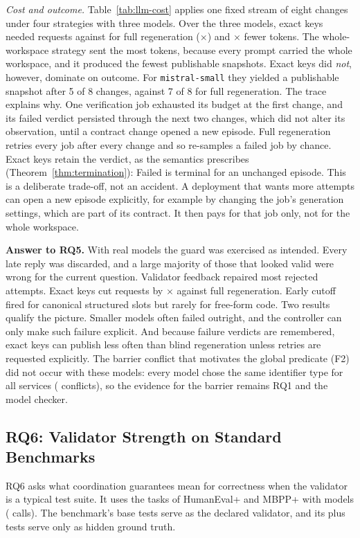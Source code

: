 \emph{Cost and outcome.} Table~\ref{tab:llm-cost} applies one fixed stream of eight changes under four strategies with three models. Over the three models, exact keys needed \LlmCostExactReq{} requests against \LlmCostFullReq{} for full regeneration (\LlmCostRatio$\times$) and \LlmCostTokenRatio$\times$ fewer tokens. The whole-workspace strategy sent the most tokens, because every prompt carried the whole workspace, and it produced the fewest publishable snapshots. Exact keys did \emph{not}, however, dominate on outcome. For \texttt{mistral-small} they yielded a publishable snapshot after 5 of 8 changes, against 7 of 8 for full regeneration. The trace explains why. One verification job exhausted its budget at the first change, and its failed verdict persisted through the next two changes, which did not alter its observation, until a contract change opened a new episode. Full regeneration retries every job after every change and so re-samples a failed job by chance. Exact keys retain the verdict, as the semantics prescribes (Theorem~\ref{thm:termination}): Failed is terminal for an unchanged episode. This is a deliberate trade-off, not an accident. A deployment that wants more attempts can open a new episode explicitly, for example by changing the job's generation settings, which are part of its contract. It then pays for that job only, not for the whole workspace.

\textbf{Answer to RQ5.} With real models the guard was exercised as intended. Every late reply was discarded, and a large majority of those that looked valid were wrong for the current question. Validator feedback repaired most rejected attempts. Exact keys cut requests by \LlmCostRatio$\times$ against full regeneration. Early cutoff fired for canonical structured slots but rarely for free-form code. Two results qualify the picture. Smaller models often failed outright, and the controller can only make such failure explicit. And because failure verdicts are remembered, exact keys can publish less often than blind regeneration unless retries are requested explicitly. The barrier conflict that motivates the global predicate (F2) did not occur with these models: every model chose the same identifier type for all services (\LlmBarrierConflicts{} conflicts), so the evidence for the barrier remains RQ1 and the model checker.

\subsection{RQ6: Validator Strength on Standard Benchmarks}\label{sec:rq6}
RQ6 asks what coordination guarantees mean for correctness when the validator is a typical test suite. It uses the \BenchTasks{} tasks of HumanEval+ and MBPP+ with \BenchModelsN{} models (\BenchCalls{} calls). The benchmark's base tests serve as the declared validator, and its plus tests serve only as hidden ground truth.

